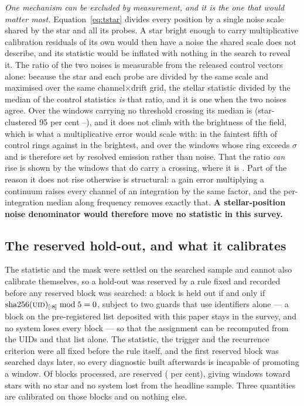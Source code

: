 \emph{One mechanism can be excluded by measurement, and it is the one that
would matter most.} Equation~\ref{eq:tstar} divides every position by a
single noise scale shared by the star and all its probes. A star bright
enough to carry multiplicative calibration residuals of its own would then
have a noise the shared scale does not describe, and its statistic would be
inflated with nothing in the search to reveal it. The ratio of the two noises
is measurable from the released control vectors alone: because the star and
each probe are divided by the same scale and maximised over the same
channel$\times$drift grid, the stellar statistic divided by the median of
the \NCtrl{} control statistics \emph{is} that ratio, and it is one when the
two noises agree. Over the \NsrNWin{} windows carrying no threshold crossing
its median is \NsrMed{} (star-clustered 95 per cent \NsrLo--\NsrHi), and it
does not climb with the brightness of the field, which is what a
multiplicative error would scale with: \NsrFifthLo{} in the faintest fifth of
control rings against \NsrFifthHi{} in the brightest, and \NsrBrightMed{}
over the \NsrBrightN{} windows whose ring exceeds \NsrBrightSig$\sigma$ and
is therefore set by resolved emission rather than noise. That the ratio
\emph{can} rise is shown by the \NsrCrossN{} windows that do carry a
crossing, where it is \NsrCrossMed. Part of the reason it does not rise
otherwise is structural: a gain error multiplying a continuum raises every
channel of an integration by the same factor, and the per-integration median
along frequency removes exactly that. \textbf{A stellar-position noise
denominator would therefore move no statistic in this survey.}

\subsection{The reserved hold-out, and what it calibrates}
\label{sec:heldout}

The statistic and the mask were settled on the searched sample and cannot also
calibrate themselves, so a hold-out was reserved by a rule fixed and recorded
before any reserved block was searched: a block is held out if and only if
$\mathrm{sha256}(\textsc{uid})_{[:8]} \bmod 5 = 0$, subject to two guards that
use identifiers alone --- a block on the pre-registered list deposited with
this paper stays in the survey, and no system loses every block --- so that
the assignment can be recomputed from the UIDs and that list alone. The
statistic, the trigger and the recurrence criterion were all fixed before the
rule itself, and the first reserved block was searched \HoLeadBlockDays{} days
later, so every diagnostic built afterwards is incapable of promoting a
window. Of \NEbProcessedAll{} blocks processed, \NEbHeldOut{} are reserved
(\HoPctHeld{} per cent), giving \HoWin{} windows toward \HoStars{} stars with
no star and no system lost from the headline sample. Three quantities are
calibrated on those blocks and on nothing else.

